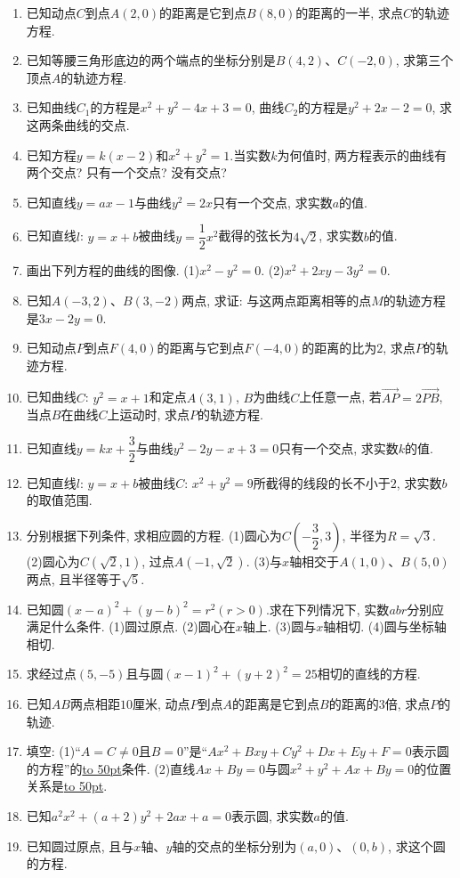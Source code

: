 \documentclass[10pt,a4paper]{article}
\newcommand{\blank}[1]{\underline{\hbox to #1pt{}}}
\begin{document}
\begin{enumerate}[1.]
\item 已知动点$C$到点$A(2,0)$的距离是它到点$B(8,0)$的距离的一半, 求点$C$的轨迹方程.
\item 已知等腰三角形底边的两个端点的坐标分别是$B(4,2)$、$C(-2,0)$, 求第三个顶点$A$的轨迹方程.
\item 已知曲线$C_1$的方程是$x^2+y^2-4x+3=0$, 曲线$C_2$的方程是$y^2+2x-2=0$, 求这两条曲线的交点.
\item 已知方程$y=k(x-2)$和$x^2+y^2=1$.当实数$k$为何值时, 两方程表示的曲线有两个交点? 只有一个交点? 没有交点?
\item 已知直线$y=ax-1$与曲线$y^2=2x$只有一个交点, 求实数$a$的值.
\item 已知直线$l$: $y=x+b$被曲线$y=\dfrac 12x^2$截得的弦长为$4\sqrt 2$, 求实数$b$的值.
\item 画出下列方程的曲线的图像.
(1)$x^2-y^2=0$.							(2)$x^2+2xy-3y^2=0$.
\item 已知$A(-3,2)$、$B(3,-2)$两点, 求证: 与这两点距离相等的点$M$的轨迹方程是$3x-2y=0$.
\item 已知动点$P$到点$F(4,0)$的距离与它到点$F(-4,0)$的距离的比为$2$, 求点$P$的轨迹方程.
\item 已知曲线$C$: $y^2=x+1$和定点$A(3,1)$, $B$为曲线$C$上任意一点, 若$\overrightarrow {AP}=2\overrightarrow {PB}$, 当点$B$在曲线$C$上运动时, 求点$P$的轨迹方程.
\item 已知直线$y=kx+\dfrac 32$与曲线$y^2-2y-x+3=0$只有一个交点, 求实数$k$的值.
\item 已知直线$l$: $y=x+b$被曲线$C$: $x^2+y^2=9$所截得的线段的长不小于$2$, 求实数$b$的取值范围.
\item 分别根据下列条件, 求相应圆的方程.
(1)圆心为$C(-\dfrac 32,3)$, 半径为$R=\sqrt 3$.
(2)圆心为$C(\sqrt 2,1)$, 过点$A(-1,\sqrt 2)$.
(3)与$x$轴相交于$A(1,0)$、$B(5,0)$两点, 且半径等于$\sqrt 5$.
\item 已知圆$(x-a)^2+(y-b)^2=r^2(r>0)$.求在下列情况下, 实数$abr$分别应满足什么条件.
(1)圆过原点.
(2)圆心在$x$轴上.
(3)圆与$x$轴相切.
(4)圆与坐标轴相切.
\item 求经过点$(5,-5)$且与圆$(x-1)^2+(y+2)^2=25$相切的直线的方程.
\item 已知$AB$两点相距$10$厘米, 动点$P$到点$A$的距离是它到点$B$的距离的$3$倍, 求点$P$的轨迹.
\item 填空:
(1)``$A=C\ne 0$且$B=0$''是``$Ax^2+Bxy+Cy^2+Dx+Ey+F=0$表示圆的方程''的\blank{50}条件.
(2)直线$Ax+By=0$与圆$x^2+y^2+Ax+By=0$的位置关系是\blank{50}.
\item 已知$a^2x^2+(a+2)y^2+2ax+a=0$表示圆, 求实数$a$的值.
\item 已知圆过原点, 且与$x$轴、$y$轴的交点的坐标分别为$(a,0)$、$(0,b)$, 求这个圆的方程.

\end{enumerate}
\end{document}
